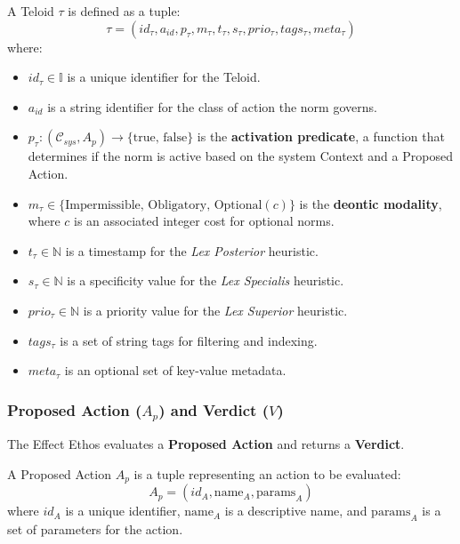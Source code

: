\begin{definition}[Teloid]
\label{def:ethos_Teloid}  
A Teloid \(\tau\) is defined as a tuple:
\[ \tau = (id_\tau, a_{id}, p_\tau, m_\tau, t_\tau, s_\tau, prio_\tau, tags_\tau, meta_\tau) \]
where:
\begin{itemize}
    \item \( id_\tau \in \mathbb{I} \) is a unique identifier for the Teloid.
    \item \( a_{id} \) is a string identifier for the class of action the norm governs.
    \item \( p_\tau: (\mathcal{C}_{sys}, A_p) \to \{\text{true, false}\} \) is the \textbf{activation predicate}, a function that determines if the norm is active based on the system Context and a Proposed Action.
    \item \( m_\tau \in \{\text{Impermissible, Obligatory, Optional}(c)\} \) is the \textbf{deontic modality}, where \(c\) is an associated integer cost for optional norms.
    \item \( t_\tau \in \mathbb{N} \) is a timestamp for the \textit{Lex Posterior} heuristic.
    \item \( s_\tau \in \mathbb{N} \) is a specificity value for the \textit{Lex Specialis} heuristic.
    \item \( prio_\tau \in \mathbb{N} \) is a priority value for the \textit{Lex Superior} heuristic.
    \item \( tags_\tau \) is a set of string tags for filtering and indexing.
    \item \( meta_\tau \) is an optional set of key-value metadata.
\end{itemize}
\end{definition}  

\subsubsection[Proposed Action and Verdict]{Proposed Action (\(A_p\)) and Verdict (\(V\))}
\label{ssec:action_verdict_formal}

The Effect Ethos evaluates a \textbf{Proposed Action} and returns a \textbf{Verdict}.

\begin{definition}
\label{def:ethos_proposed_action}  
A Proposed Action \(A_p\) is a tuple representing an action to be evaluated:
\[ A_p = (id_A, \text{name}_A, \text{params}_A) \]
where \(id_A\) is a unique identifier, \(\text{name}_A\) is a descriptive name, and \(\text{params}_A\) is a set of parameters for the action.
\end{definition}  


